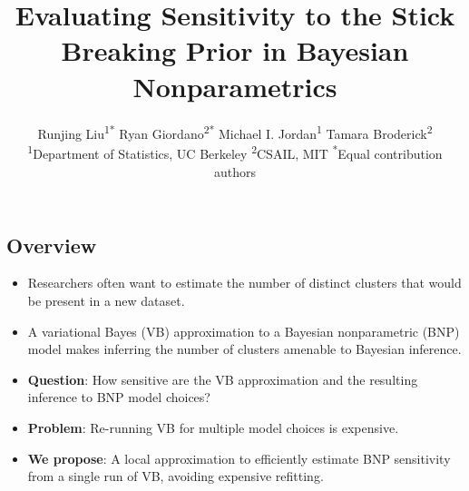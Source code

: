 \documentclass[a0,plainsections,30pt]{sciposter}\usepackage[]{graphicx}\usepackage[]{color}
\title{\textcolor{mydarkblue}{
Evaluating Sensitivity to the Stick Breaking Prior in Bayesian Nonparametrics
}}
\author{%
Runjing Liu\textsuperscript{1*} \quad
Ryan Giordano\textsuperscript{2*} \quad
Michael I. Jordan\textsuperscript{1} \quad
Tamara Broderick\textsuperscript{2} \\
{\large\normalfont
 \textsuperscript{1}Department of Statistics, UC Berkeley\quad
 \textsuperscript{2}CSAIL, MIT\quad
 \textsuperscript{*}Equal contribution authors}
}
\begin{document}

\setlength{\parskip}{0.25em}

\maketitle

\vspace{-1in}






\begin{minipage}[t]{0.45\textwidth}

\begin{mdframed}[style=MyFrame]
\section*{Overview}
\vspace{-0.3in}
\begin{itemize}
\item Researchers often want to estimate the number of distinct clusters
that would be present in a new dataset.

\item A variational Bayes (VB) approximation to a Bayesian nonparametric (BNP)
model makes inferring the number of clusters amenable to Bayesian inference.

\item \textbf{Question}: How sensitive are the
VB approximation and the resulting inference to BNP model choices?

\item \textbf{Problem}: Re-running VB for multiple model choices is expensive.

\item \textbf{We propose}: A local approximation to efficiently
estimate BNP sensitivity from a single run of VB, avoiding
expensive refitting.

\end{itemize}
\end{mdframed}
\vspace{-0.7in}


\end{minipage}
\end{document}

